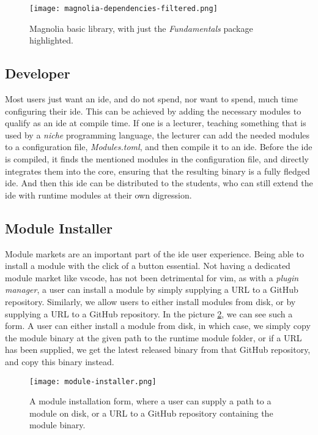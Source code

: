 \begin{figure}[H]
  \centering
  \texttt{[image: magnolia-dependencies-filtered.png]}
  \caption{
    Magnolia basic library, with just the \textit{Fundamentals} package
    highlighted.
  }
  \label{pic:depDis}
\end{figure}


\subsection{Developer}

Most users just want an \gls*{ide}, and do not spend, nor want to spend, much
time configuring their \gls*{ide}. This can be achieved by adding the necessary
modules to qualify as an \gls*{ide} at compile time. If one is a lecturer,
teaching something that is used by a \textit{niche} programming language, the
lecturer can add the needed modules to a configuration file,
\textit{Modules.toml}, and then compile it to an \gls*{ide}. Before the \gls*{ide}
is compiled, it finds the mentioned modules in the configuration file, and
directly integrates them into the core, ensuring that the resulting binary is a
fully fledged \gls*{ide}. And then this \gls*{ide} can be distributed to the
students, who can still extend the \gls*{ide} with runtime modules at their own
digression.

\subsection{Module Installer}

Module markets are an important part of the \gls*{ide} user experience. Being
able to install a module with the click of a button essential. Not having a
dedicated module market like \gls*{vscode}, has not been detrimental for
\gls*{vim}, as with a \textit{plugin manager}, a user can install a module by
simply supplying a URL to a GitHub repository. Similarly, we allow users to
either install modules from disk, or by supplying a URL to a GitHub repository.
In the picture \ref{pic:moduleInstaller}, we can see such a form. A user can
either install a module from disk, in which case, we simply copy the module
binary at the given path to the runtime module folder, or if a URL has been
supplied, we get the latest released binary from that GitHub repository, and
copy this binary instead.

\begin{figure}
  \centering
  \texttt{[image: module-installer.png]}
  \caption{
    A module installation form, where a user can supply a path to a module on
    disk, or a URL to a GitHub repository containing the module binary.
  }
  \label{pic:moduleInstaller}
\end{figure}

